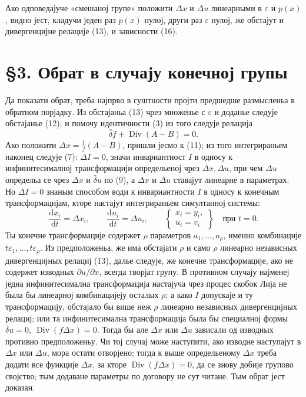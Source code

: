 ﻿\documentclass[11pt]{article}
\providecommand{\eps}{\varepsilon}
\providecommand{\D}{\Delta}
\providecommand{\p}{\partial}
\providecommand{\dd}{\mathrm d}
\DeclareMathOperator{\Div}{Div}
\providecommand{\bd}{\bar{\delta}}
\begin{document}
Ако одповедајуче «смешаној групе» положити \(\D x\) и \(\D u\) линеарными в \(\eps\) и \(p(x)\), видно јест, кладучи једен раз \(p(x)\) нулој, други раз \(\eps\) нулој, же обстајут и дивергенцијне релације (13), и зависности (16).

\section*{\S{}3. Обрат в случају конечној групы}

Да показати обрат, треба најпрво в суштности пројти предшедше размысленьа в обратном порјадку. Из обстајаньа (13) чрез множенье с \(\eps\) и доданье следује обстајанье (12); и помочу идентичности (3) из того следује релација
\[
\bd f+\Div(A-B)=0.
\]
Ако положити \(\D x=\frac{1}{f}(A-B)\), пришли јесмо к (11); из того интегрираньем наконец следује (7): \(\D I=0\), значи инвариантност \(I\) в односу к инфинитесималној трансформацији определьеној чрез \(\D x,\D u\), при чем \(\D u\) определьа се чрез \(\D x\) и \(\bd u\) по (9), а \(\D x\) и \(\D u\) ставајут линеарне в параметрах. Но \(\D I=0\) знаным способом води к инвариантности \(I\) в односу к конечным трансформацијам, кторе настајут интегрираньем симултанној системы:
\begin{equation}
\frac{\dd x_i}{\dd t}=\D x_i,\qquad
\frac{\dd u_i}{\dd t}=\D u_i,\qquad
\left\{\begin{array}{l}
x_i=y_i,\\
u_i=v_i
\end{array}\right\}
\quad\text{при }t=0.
\tag{17}
\end{equation}
Ты конечне трансформације содержет \(\rho\) параметров \(a_1,\ldots,a_\rho\), именно комбинације \(t\eps_1,\ldots,t\eps_\rho\). Из предположеньа, же има обстајати \(\rho\) и само \(\rho\) линеарно независных дивергенцијных релациј (13), далье следује, же конечне трансформације, ако не содержет изводных \(\p u/\p x\), всегда творјат групу. В противном случају најменеј једна инфинитесимална трансформација настајуча чрез процес скобок Лија не была бы линеарној комбинацијеју осталых \(\rho\); а како \(I\) допускаје и ту трансформацију, обстајало бы више неж \(\rho\) линеарно независных дивергенцијных релациј; или та инфинитесимална трансформација была бы специалној формы \(\bd u=0,\ \Div(f\D x)=0\). Тогда бы але \(\D x\) или \(\D u\) зависали од изводных противно предположеньу. Чи тој случај може наступити, ако изводне наступајут в \(\D x\) или \(\D u\), мора остати отворјено; тогда к выше определьеному \(\D x\) треба додати все функције \(\D x\), за кторе \(\Div(f\D x)=0\), да се знову добије групово својство; тым додаване параметры по договору не сут читане. Тым обрат јест доказан.
\end{document}

